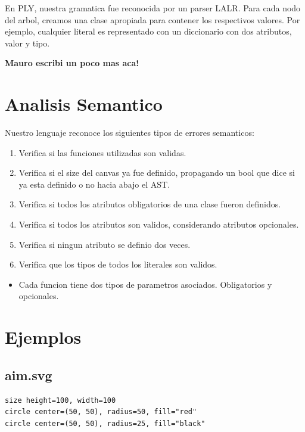 \documentclass{article}
\theoremstyle{definition}
\theoremstyle{remark}
\begin{document}
En PLY, nuestra gramatica fue reconocida por un parser LALR. Para cada nodo del arbol, creamos una clase apropiada para contener los respectivos valores. Por ejemplo, cualquier literal es representado con un diccionario con dos atributos, valor y tipo.

\textbf{Mauro escribi un poco mas aca!}

\section{Analisis Semantico}

Nuestro lenguaje reconoce los siguientes tipos de errores semanticos:

\begin{enumerate}
	\item Verifica si las funciones utilizadas son validas.
	\item Verifica si el size del canvas ya fue definido, propagando un bool que dice si ya esta definido o no hacia abajo el AST.
	\item Verifica si todos los atributos obligatorios de una clase fueron definidos.
	\item Verifica si todos los atributos son validos, considerando atributos opcionales.
	\item Verifica si ningun atributo se definio dos veces.
	\item Verifica que los tipos de todos los literales son validos.
\end{enumerate}

\begin{itemize}
	\item Cada funcion tiene dos tipos de parametros asociados. Obligatorios y opcionales.
\end{itemize}

\pagebreak

\section{Ejemplos}

\subsection{aim.svg}

\begin{verbatim}
size height=100, width=100
circle center=(50, 50), radius=50, fill="red"
circle center=(50, 50), radius=25, fill="black"
\end{verbatim}
\end{document}
